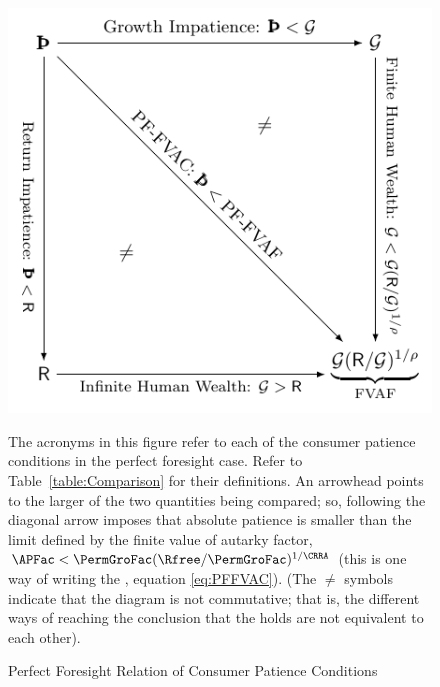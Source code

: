 \begin{figure}[ht]
  \centerline{
    \includegraphics[width=5in]{Figures/RelatePFGICFHWCRICPFFVAC}
  }
  \caption{Perfect Foresight Relation of Consumer Patience Conditions}
  \label{fig:RelatePFGICFHWCRICPFFVAC}
  \footnotesize{The acronyms in this figure refer to each of the consumer patience conditions in the perfect foresight case. Refer to Table~\ref{table:Comparison} for their definitions. An arrowhead points to the larger of the two quantities being compared; so, following the diagonal arrow imposes that absolute patience is smaller than the limit defined by the finite value of autarky factor, $\APFac < \PermGroFac (\Rfree/\PermGroFac)^{1/\CRRA}$ (this is one way of writing the {\PFFVAC}, equation \eqref{eq:PFFVAC}}). (The $\neq$ symbols indicate that the diagram is not commutative; that is, the different ways of reaching the conclusion that the {\PFFVAC} holds are not equivalent to each other).
\end{figure}
